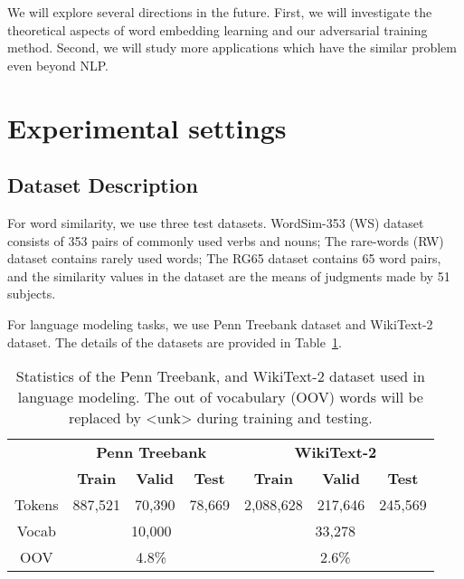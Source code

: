 \documentclass{article}
\begin{document}
We will explore several directions in the future. First, we will investigate the theoretical aspects of word embedding learning and our adversarial training method. Second, we will study more applications which have the similar problem even beyond NLP.

\clearpage



\appendix
\section{Experimental settings}
\subsection{Dataset Description}
For word similarity, we use three test datasets. WordSim-353 (WS) dataset consists of 353 pairs of commonly used verbs and nouns; The rare-words (RW) dataset contains rarely used words; The RG65 dataset contains 65 word pairs, and the similarity values in the dataset are the means of judgments made by 51 subjects.

For language modeling tasks, we use Penn Treebank dataset and WikiText-2 dataset. The details of the datasets are provided in
 Table~\ref{lm-data-table}.

\begin{table}[!htbp]
\begin{center}
		\begin{tabular}{c|ccc|ccc}
			\toprule
			& \multicolumn{3}{c|}{\bf Penn Treebank} & \multicolumn{3}{c}{\bf WikiText-2} \\
            \cline{2-7}
            & \bf Train & \bf Valid & \bf Test & \bf Train & \bf Valid & \bf Test \\
            \hline
            Tokens &887,521&70,390&78,669&2,088,628&217,646&245,569 \\
            \hline
            Vocab & \multicolumn{3}{c|}{10,000} & \multicolumn{3}{c}{33,278} \\
            \hline
            OOV & \multicolumn{3}{c|}{4.8\%} & \multicolumn{3}{c}{2.6\%} \\
            \bottomrule
		\end{tabular}
	\end{center}
	\caption{\label{lm-data-table} Statistics of the Penn Treebank, and WikiText-2 dataset used in language modeling. The out of vocabulary (OOV) words will be replaced by <unk> during training and testing.}
\end{table}
\end{document}
